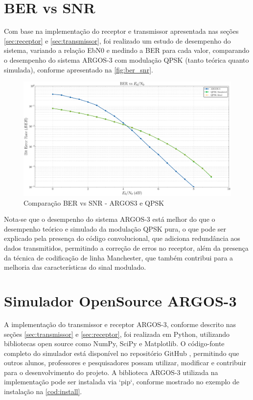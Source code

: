\begin{apendicesenv}
\chapter{BER vs SNR}

Com base na implementação do receptor e transmissor apresentada nas seções \ref{sec:receptor} e \ref{sec:transmissor}, foi realizado um estudo de desempenho do sistema, variando a relação \gls{EbN0} e medindo a \gls{BER} para cada valor, comparando o desempenho do sistema ARGOS-3 com modulação \gls{QPSK} (tanto teórica quanto simulada), conforme apresentado na \autoref{fig:ber_snr}.

\begin{figure}[H]
	\centering
	\caption{Comparação BER vs SNR - ARGOS3 e QPSK}\label{fig:ber_snr}
	\includegraphics[width=\linewidth]{assets/apendice/ber_vs_ebn0.pdf}
\end{figure}

Nota-se que o desempenho do sistema ARGOS-3 está melhor do que o desempenho teórico e simulado da modulação \gls{QPSK} pura, o que pode ser explicado pela presença do código convolucional, que adiciona redundância aos dados transmitidos, permitindo a correção de erros no receptor, além da presença da técnica de codificação de linha \gls{Manchester}, que também contribui para a melhoria das características do sinal modulado.


\chapter{Simulador OpenSource ARGOS-3}

A implementação do transmissor e receptor ARGOS-3, conforme descrito nas seções \ref{sec:transmissor} e \ref{sec:receptor}, foi realizada em Python, utilizando bibliotecas open source como NumPy, SciPy e Matplotlib. O código-fonte completo do simulador está disponível no repositório GitHub \cite{githubrepository}, permitindo que outros alunos, professores e pesquisadores possam utilizar, modificar e contribuir para o desenvolvimento do projeto. A biblioteca ARGOS-3 utilizada na implementação pode ser instalada via `pip`, conforme mostrado no exemplo de instalação na \autoref{cod:install}. 


\end{apendicesenv}
